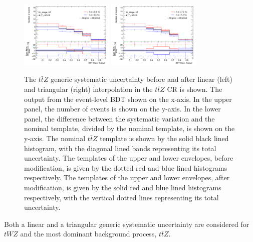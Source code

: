 \begin{figure}[h!]
  \includegraphics[width=0.4\textwidth]{figures/lep4_ttZ_4T_ttz_shape_20percent_linear.png}
  \includegraphics[width=0.4\textwidth]{figures/lep4_ttZ_4T_ttz_shape_20percent_triangular.png}
  \centering
  
  \caption{The $t\bar{t}Z$ generic systematic uncertainty before and after linear (left) and triangular (right) interpolation in the $t\bar{t}Z$ CR is shown. The output from the event-level BDT shown on the x-axis. In the upper panel, the number of events is shown on the y-axis. In the lower panel, the difference between the systematic variation and the nominal template, divided by the nominal template, is shown on the y-axis. The nominal $t\bar{t}Z$ template is shown by the solid black lined histogram, with the diagonal lined bands representing its total uncertainty. The templates of the upper and lower envelopes, before modification, is given by the dotted red and blue lined histograms respectively. The templates of the upper and lower envelopes, after modification, is given by the solid red and blue lined histograms respectively, with the vertical dotted lines representing its total uncertainty. }
  \label{fig:genericShapeSystexamples}
\end{figure}Both a linear and a triangular generic systematic uncertainty are considered for $tWZ$ and the most dominant background process, $t\bar{t}Z$.

